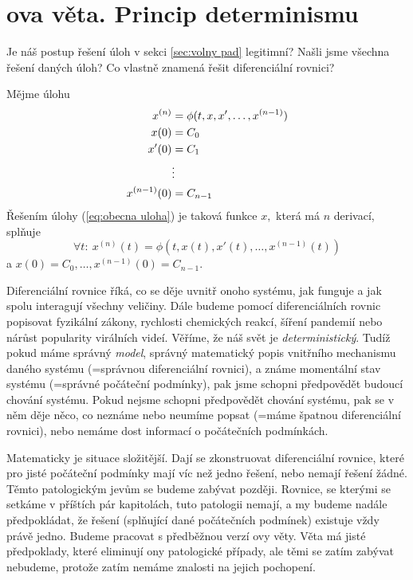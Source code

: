 \section{\PL ova věta. Princip determinismu}
Je náš postup řešení úloh v sekci \ref{sec:volny pad} legitimní? Našli jsme všechna řešení daných úloh? Co vlastně znamená řešit diferenciální rovnici?

\begin{definice} Mějme úlohu
\begin{align}
	x^{(n)}&=\phi(t,x,x',\hdots,x^{(n-1)})\notag \\
	x(0) &= C_0\notag \\
	x'(0) &= C_1\quad \label{eq:obecna uloha} \\
	      &\vdots\notag \\
	x^{(n-1)}(0) &= C_{n-1}\notag
\end{align}
Řešením úlohy (\ref{eq:obecna uloha}) je taková funkce $x,$ která má $n$ derivací, splňuje
\begin{equation*}
	\forall t\colon\ x^{(n)}(t)=\phi(t,x(t),x'(t),\hdots,x^{(n-1)}(t))
\end{equation*}
a $x(0)=C_0,\hdots,x^{(n-1)}(0)=C_{n-1}.$
\end{definice}
 Diferenciální rovnice říká, co se děje uvnitř onoho systému, jak funguje a jak spolu interagují všechny veličiny. Dále budeme pomocí diferenciálních rovnic popisovat fyzikální zákony, rychlosti chemických reakcí, šíření pandemií nebo nárůst popularity virálních videí. Věříme, že náš svět je \textit{deterministický}. Tudíž pokud máme správný \textit{model}, správný matematický popis vnitřního mechanismu daného systému (=správnou diferenciální rovnici), a známe momentální stav systému (=správné počáteční podmínky), pak jsme schopni předpovědět budoucí chování systému. Pokud nejsme schopni předpovědět chování systému, pak se v něm děje něco, co neznáme nebo neumíme popsat (=máme špatnou diferenciální rovnici), nebo nemáme dost informací o počátečních podmínkách.

Matematicky je situace složitější. Dají se zkonstruovat diferenciální rovnice, které pro jisté počáteční podmínky mají víc než jedno řešení, nebo nemají řešení žádné. Těmto patologickým jevům se budeme zabývat později. Rovnice, se kterými se setkáme v příštích pár kapitolách, tuto patologii nemají, a my budeme nadále předpokládat, že řešení (splňující dané počátečních podmínek) existuje vždy právě jedno. Budeme pracovat s předběžnou verzí \PL ovy věty. Věta má jisté předpoklady, které eliminují ony patologické případy, ale těmi se zatím zabývat nebudeme, protože zatím nemáme znalosti na jejich pochopení.

